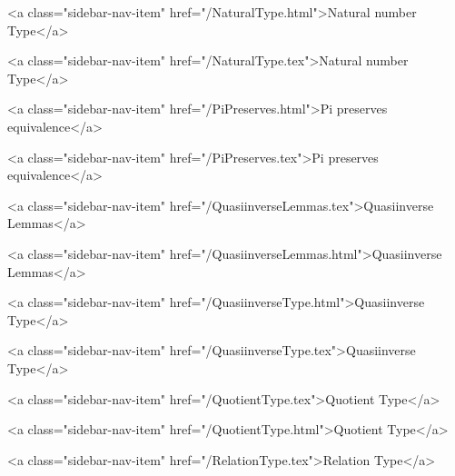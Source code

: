       
        
          <a class="sidebar-nav-item" href="/NaturalType.html">Natural number Type</a>
        
      
    
      
        
          <a class="sidebar-nav-item" href="/NaturalType.tex">Natural number Type</a>
        
      
    
      
        
          <a class="sidebar-nav-item" href="/PiPreserves.html">Pi preserves equivalence</a>
        
      
    
      
        
          <a class="sidebar-nav-item" href="/PiPreserves.tex">Pi preserves equivalence</a>
        
      
    
      
        
          <a class="sidebar-nav-item" href="/QuasiinverseLemmas.tex">Quasiinverse Lemmas</a>
        
      
    
      
        
          <a class="sidebar-nav-item" href="/QuasiinverseLemmas.html">Quasiinverse Lemmas</a>
        
      
    
      
        
          <a class="sidebar-nav-item" href="/QuasiinverseType.html">Quasiinverse Type</a>
        
      
    
      
        
          <a class="sidebar-nav-item" href="/QuasiinverseType.tex">Quasiinverse Type</a>
        
      
    
      
        
          <a class="sidebar-nav-item" href="/QuotientType.tex">Quotient Type</a>
        
      
    
      
        
          <a class="sidebar-nav-item" href="/QuotientType.html">Quotient Type</a>
        
      
    
      
        
          <a class="sidebar-nav-item" href="/RelationType.tex">Relation Type</a>
        
